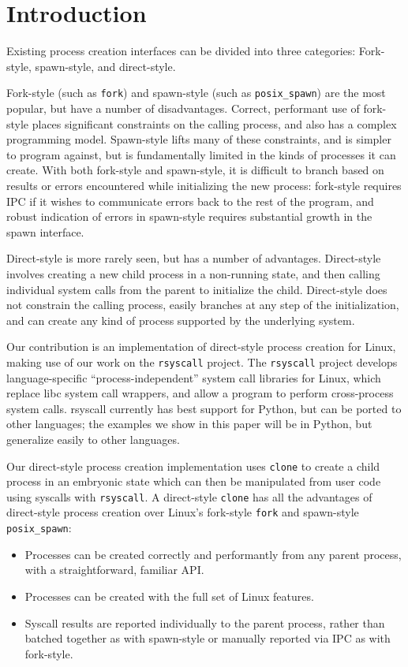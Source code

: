 \documentclass[sigplan]{acmart}
\begin{document}
\section{Introduction}\label{introduction}
Existing process creation interfaces can be divided into three categories:
Fork-style, spawn-style, and direct-style.

Fork-style (such as \texttt{fork}) and spawn-style (such as \texttt{posix\_spawn}) are the most popular,
but have a number of disadvantages.
Correct, performant use of fork-style places significant constraints on the calling process,
and also has a complex programming model.
Spawn-style lifts many of these constraints, and is simpler to program against,
but is fundamentally limited in the kinds of processes it can create.
With both fork-style and spawn-style,
it is difficult to
branch based on results or errors encountered while initializing the new process:
fork-style requires IPC if it wishes to communicate errors back to the rest of the program,
and robust indication of errors in spawn-style requires substantial growth in the spawn interface.

Direct-style is more rarely seen, but has a number of advantages.
Direct-style involves creating a new child process in a non-running state,
and then calling individual system calls from the parent to initialize the child.
Direct-style does not constrain the calling process,
easily branches at any step of the initialization,
and can create any kind of process supported by the underlying system.

Our contribution is an implementation of direct-style process creation for Linux,
making use of our work on the \texttt{rsyscall} project.
The \texttt{rsyscall} project develops language-specific ``process-independent'' system call libraries for Linux,
which replace libc system call wrappers, and allow a program to perform cross-process system calls.
rsyscall currently has best support for Python,
but can be ported to other languages;
the examples we show in this paper will be in Python,
but generalize easily to other languages.

Our direct-style process creation implementation uses \texttt{clone} to create a child process in an embryonic state
which can then be manipulated from user code using syscalls with \texttt{rsyscall}.
A direct-style \texttt{clone} has all the advantages of direct-style process creation
over Linux's fork-style \texttt{fork} and spawn-style \texttt{posix\_spawn}:
\begin{itemize}
\item
  Processes can be created correctly and performantly from any parent process,
  with a straightforward, familiar API.
\item
  Processes can be created with the full set of Linux features.
\item
  Syscall results are reported individually to the parent process,
  rather than batched together as with spawn-style or manually reported via IPC as with fork-style.
\end{itemize}
\end{document}
